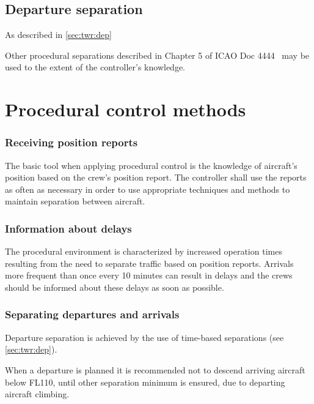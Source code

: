 \subsection{Departure separation}
As described in \cref{sec:twr:dep}

Other procedural separations described in Chapter 5 of ICAO Doc 4444~\cite{4444} may be used to the extent of the controller's knowledge.

\section{Procedural control methods}
\label{sec:app:procedural_methods}

\subsubsection{Receiving position reports}

The basic tool when applying procedural control is the knowledge of aircraft's
position based on the crew's position report. The controller shall use the
reports as often as necessary in order to use appropriate techniques and methods
to maintain separation between aircraft.

\subsubsection{Information about delays}

The procedural environment is characterized by increased operation times
resulting from the need to separate traffic based on position reports. Arrivals
more frequent than once every 10 minutes can result in delays and the crews
should be informed about these delays as soon as possible.

\subsubsection{Separating departures and arrivals}

Departure separation is achieved by the use of time-based separations (see
\cref{sec:twr:dep}).

When a departure is planned it is recommended not to descend arriving aircraft
below FL110, until other separation minimum is ensured, due to departing
aircraft climbing.

